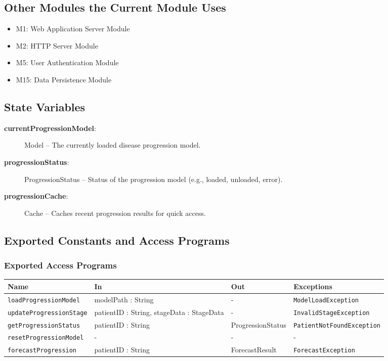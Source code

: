 \documentclass[12pt, titlepage]{article}
\begin{document}
\subsection{Other Modules the Current Module Uses}
\begin{itemize}
    \item M1: Web Application Server Module
    \item M2: HTTP Server Module
    \item M5: User Authentication Module
    \item M15: Data Persistence Module
\end{itemize}

\subsection{State Variables}
\begin{description}
    \item[\textbf{currentProgressionModel}:] Model -- The currently loaded disease progression model.
    \item[\textbf{progressionStatus}:] ProgressionStatus -- Status of the progression model (e.g., loaded, unloaded, error).
    \item[\textbf{progressionCache}:] Cache -- Caches recent progression results for quick access.
\end{description}

\subsection{Exported Constants and Access Programs}

\subsubsection{Exported Access Programs}
\begin{center}
  \begin{tabular}{|l|l|l|l|}
    \hline
    \textbf{Name} & \textbf{In} & \textbf{Out} & \textbf{Exceptions} \\
    \hline 
    \texttt{loadProgressionModel} & modelPath : String & - & \texttt{ModelLoadException} \\
    \hline
    \texttt{updateProgressionStage} & patientID : String, stageData : StageData & - & \texttt{InvalidStageException} \\
    \hline
    \texttt{getProgressionStatus} & patientID : String & ProgressionStatus & \texttt{PatientNotFoundException} \\
    \hline
    \texttt{resetProgressionModel} & - & - & - \\
    \hline
    \texttt{forecastProgression} & patientID : String & ForecastResult & \texttt{ForecastException} \\
    \hline
  \end{tabular}
\end{center}
\end{document}
